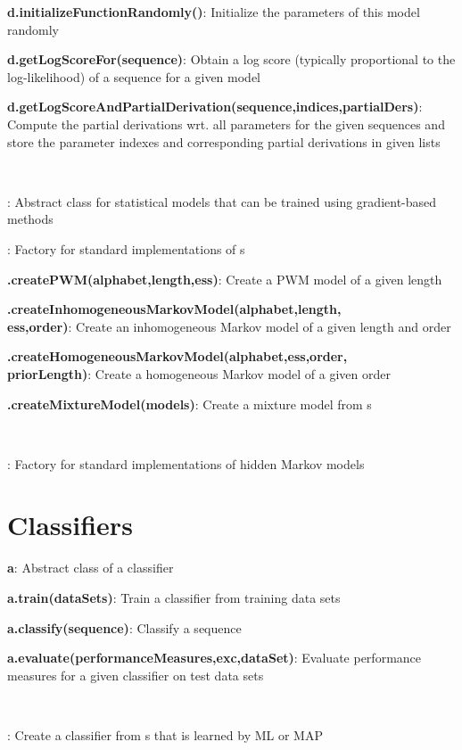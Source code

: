 \documentclass[10pt]{scrartcl}
\newcommand{\entry}[3]{{\bfseries #1#2}: #3}
\begin{document}
\begin{flushleft}
\entry{d}{.initializeFunctionRandomly()}{Initialize the parameters of this model randomly}

\entry{d}{.getLogScoreFor(sequence)}{Obtain a log score (typically proportional to the log-likelihood) of a sequence for a given model}

\entry{d}{.getLogScoreAndPartialDerivation(sequence,indices,partialDers)}{Compute the partial derivations wrt. all parameters for the given sequences and store the parameter indexes and corresponding partial derivations in given lists}

~

\entry{\AbstractDiffSM}{}{Abstract class for statistical models that can be trained using gradient-based methods}

\entry{\DiffSMFactory}{}{Factory for standard implementations of \DiffSM s}

\entry{\DiffSMFactory}{.createPWM(alphabet,length,ess)}{Create a PWM model of a given length}

\entry{\DiffSMFactory}{.createInhomogeneousMarkovModel(alphabet,length,\\ess,order)}{Create an inhomogeneous Markov model of a given length and order}

\entry{\DiffSMFactory}{.createHomogeneousMarkovModel(alphabet,ess,order,\\priorLength)}{Create a homogeneous Markov model of a given order}

\entry{\DiffSMFactory}{.createMixtureModel(models)}{Create a mixture model from \DiffSM s}

~

\entry{\HMMFactory}{}{Factory for standard implementations of hidden Markov models}

\section{Classifiers}

\entry{\AbstractClassifier}{ a}{Abstract class of a classifier}

\entry{a}{.train(dataSets)}{Train a classifier from training data sets}

\entry{a}{.classify(sequence)}{Classify a sequence}

\entry{a}{.evaluate(performanceMeasures,exc,dataSet)}{Evaluate performance measures for a given classifier on test data sets}

~

\entry{\TrainSMBasedClassifier}{}{Create a classifier from \TrainSM s that is learned by ML or MAP}


\end{flushleft}
\end{document}
